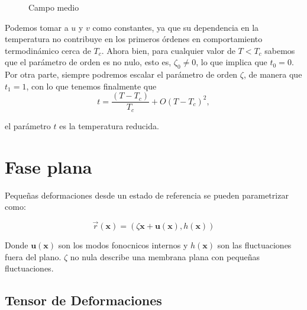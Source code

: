 \begin{figure}[h]
\centering
 \resizebox{\columnwidth}{!}{}
\caption{Campo medio}
\end{figure}

Podemos tomar a $u$ y $v$ como constantes, ya que su dependencia en la 
temperatura no contribuye en los primeros órdenes en comportamiento
termodinámico cerca de $T_c$. Ahora bien,
para cualquier valor de $T\!<\!T_c$ sabemos que el parámetro de orden es no
nulo, esto es, $\zeta_0\!\neq\! 0$, lo que implica que $t_0=0$. Por otra
parte, siempre podremos escalar el parámetro de orden 
$\zeta$, de manera que $t_1=1$, con lo que tenemos finalmente que
\begin{equation}
t=\frac{(T-T_c)}{T_c}+O(T-T_c)^2,
\end{equation}

el parámetro $t$ es la temperatura reducida.


 
\section{Fase plana}

Pequeñas deformaciones desde un estado de referencia se pueden parametrizar
como:

\begin{equation}
\vec{r}(\mathbf{x})=(\zeta \mathbf{x}+\mathbf{u(\mathbf{x})},h(\mathbf{x}))
\end{equation}

Donde $\mathbf{u(\mathbf{x})}$ son los modos fonocnicos internos y
$h(\mathbf{x})$ son las fluctuaciones fuera del plano.
$\zeta$ no nula describe una membrana plana con pequeñas fluctuaciones.

\subsection{Tensor de Deformaciones}

